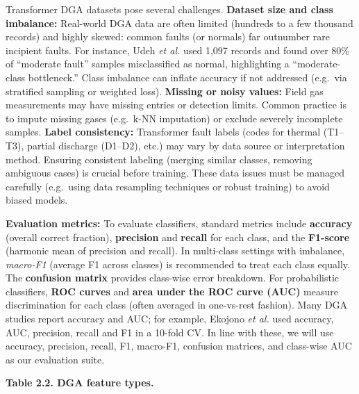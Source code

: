 Transformer DGA datasets pose several challenges. \textbf{Dataset size
and class imbalance:} Real-world DGA data are often limited (hundreds to
a few thousand records) and highly skewed: common faults (or normals)
far outnumber rare incipient faults. For instance, Udeh \emph{et al.}
used 1,097 records and found over 80\% of ``moderate fault'' samples
misclassified as normal, highlighting a ``moderate-class bottleneck.''
Class imbalance can inflate accuracy if not addressed (e.g.~via
stratified sampling or weighted loss). \textbf{Missing or noisy values:}
Field gas measurements may have missing entries or detection limits.
Common practice is to impute missing gases (e.g.~k-NN imputation) or
exclude severely incomplete samples. \textbf{Label consistency:}
Transformer fault labels (codes for thermal (T1--T3), partial discharge
(D1--D2), etc.) may vary by data source or interpretation method.
Ensuring consistent labeling (merging similar classes, removing
ambiguous cases) is crucial before training. These data issues must be
managed carefully (e.g.~using data resampling techniques or robust
training) to avoid biased models.

\textbf{Evaluation metrics:} To evaluate classifiers, standard metrics
include \textbf{accuracy} (overall correct fraction), \textbf{precision}
and \textbf{recall} for each class, and the \textbf{F1-score} (harmonic
mean of precision and recall). In multi-class settings with imbalance,
\emph{macro-F1} (average F1 across classes) is recommended to treat each
class equally. The \textbf{confusion matrix} provides class-wise error
breakdown. For probabilistic classifiers, \textbf{ROC curves} and
\textbf{area under the ROC curve (AUC)} measure discrimination for each
class (often averaged in one-vs-rest fashion). Many DGA studies report
accuracy and AUC; for example, Ekojono \emph{et al.} used accuracy, AUC,
precision, recall and F1 in a 10-fold CV. In line with these, we will
use accuracy, precision, recall, F1, macro-F1, confusion matrices, and
class-wise AUC as our evaluation suite.

\textbf{Table 2.2. DGA feature types.}

